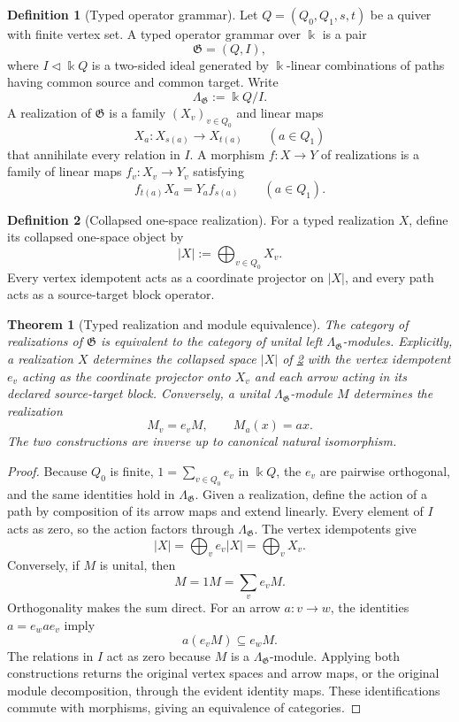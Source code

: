 \documentclass[11pt]{article}
\newtheorem{theorem}{Theorem}[section]
\theoremstyle{definition}
\newtheorem{definition}[definition]{Definition}
\theoremstyle{remark}
\theoremstyle{definition}\newtheorem{example}[theorem]{Example}
\newcommand{\bbk}{\Bbbk}
\newcommand{\RecordID}[1]{\label{record:#1}}
\newcommand{\Depends}[1]{}
\begin{document}
\begin{definition}[Typed operator grammar]
\label{def:typed-grammar}
Let $Q=(Q_0,Q_1,s,t)$ be a quiver with finite vertex set.  A typed operator grammar over $\bbk$ is a pair
\[
\mathfrak G=(Q,I),
\]
where $I\triangleleft \bbk Q$ is a two-sided ideal generated by $\bbk$-linear combinations of paths having common source and common target.  Write
\[
\Lambda_{\mathfrak G}:=\bbk Q/I.
\]
A realization of $\mathfrak G$ is a family $(X_v)_{v\in Q_0}$ and linear maps
\[
X_a:X_{s(a)}\longrightarrow X_{t(a)}
\qquad(a\in Q_1)
\]
that annihilate every relation in $I$.  A morphism $f:X\to Y$ of realizations is a family of linear maps $f_v:X_v\to Y_v$ satisfying
\[
f_{t(a)}X_a=Y_af_{s(a)}
\qquad(a\in Q_1).
\]
\end{definition}
\RecordID{PSC-I-D-TYPED-GRAMMAR}

\begin{definition}[Collapsed one-space realization]
\label{def:collapsed-realization}
For a typed realization $X$, define its collapsed one-space object by
\[
|X|:=\bigoplus_{v\in Q_0}X_v.
\]
Every vertex idempotent acts as a coordinate projector on $|X|$, and every path acts as a source-target block operator.
\end{definition}
\RecordID{PSC-I-D-COLLAPSED-REALIZATION}

\begin{theorem}[Typed realization and module equivalence]
\label{thm:typed-module-equivalence}
The category of realizations of $\mathfrak G$ is equivalent to the category of unital left $\Lambda_{\mathfrak G}$-modules.  Explicitly, a realization $X$ determines the collapsed space $|X|$ of \cref{def:collapsed-realization}
with the vertex idempotent $e_v$ acting as the coordinate projector onto $X_v$ and each arrow acting in its declared source-target block.  Conversely, a unital $\Lambda_{\mathfrak G}$-module $M$ determines the realization
\[
M_v=e_vM,
\qquad
M_a(x)=ax.
\]
The two constructions are inverse up to canonical natural isomorphism.
\end{theorem}
\RecordID{PSC-I-T-TYPED-MODULE-EQUIVALENCE}
\Depends{PSC-I-D-TYPED-GRAMMAR.}

\begin{proof}
Because $Q_0$ is finite, $1=\sum_{v\in Q_0}e_v$ in $\bbk Q$, the $e_v$ are pairwise orthogonal, and the same identities hold in $\Lambda_{\mathfrak G}$.  Given a realization, define the action of a path by composition of its arrow maps and extend linearly.  Every element of $I$ acts as zero, so the action factors through $\Lambda_{\mathfrak G}$.  The vertex idempotents give
\[
|X|=\bigoplus_v e_v|X|=\bigoplus_vX_v.
\]
Conversely, if $M$ is unital, then
\[
M=1M=\sum_ve_vM.
\]
Orthogonality makes the sum direct.  For an arrow $a:v\to w$, the identities $a=e_wae_v$ imply
\[
a(e_vM)\subseteq e_wM.
\]
The relations in $I$ act as zero because $M$ is a $\Lambda_{\mathfrak G}$-module.  Applying both constructions returns the original vertex spaces and arrow maps, or the original module decomposition, through the evident identity maps.  These identifications commute with morphisms, giving an equivalence of categories.
\end{proof}
\end{document}
